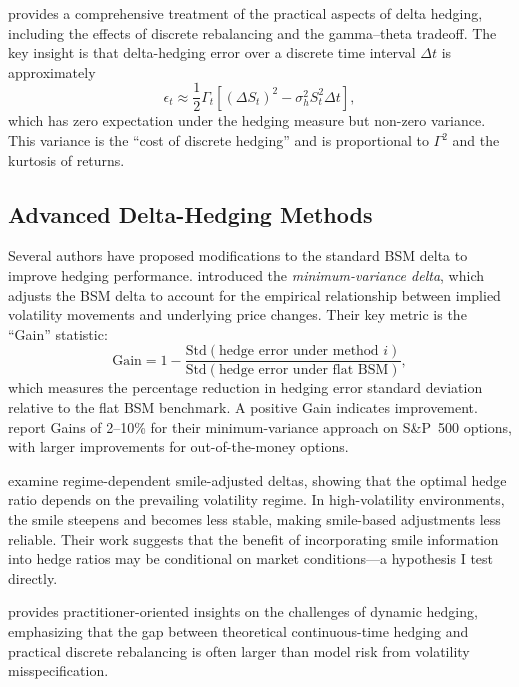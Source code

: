 \documentclass[12pt, letterpaper]{article}
\begin{document}
\citet{Hull2018} provides a comprehensive treatment of the practical aspects of delta hedging, including the effects of discrete rebalancing and the gamma--theta tradeoff. The key insight is that delta-hedging error over a discrete time interval $\Delta t$ is approximately
\begin{equation}
    \epsilon_t \approx \frac{1}{2}\Gamma_t \left[(\Delta S_t)^2 - \sigma_h^2 S_t^2 \Delta t\right],
    \label{eq:discrete_error}
\end{equation}
which has zero expectation under the hedging measure but non-zero variance. This variance is the ``cost of discrete hedging'' and is proportional to $\Gamma^2$ and the kurtosis of returns.

\subsection{Advanced Delta-Hedging Methods}

Several authors have proposed modifications to the standard BSM delta to improve hedging performance. \citet{Hull2017} introduced the \textit{minimum-variance delta}, which adjusts the BSM delta to account for the empirical relationship between implied volatility movements and underlying price changes. Their key metric is the ``Gain'' statistic:
\begin{equation}
    \text{Gain} = 1 - \frac{\text{Std}(\text{hedge error under method } i)}{\text{Std}(\text{hedge error under flat BSM})},
    \label{eq:gain}
\end{equation}
which measures the percentage reduction in hedging error standard deviation relative to the flat BSM benchmark. A positive Gain indicates improvement. \citet{Hull2017} report Gains of 2--10\% for their minimum-variance approach on S\&P~500 options, with larger improvements for out-of-the-money options.

\citet{Alexander2012} examine regime-dependent smile-adjusted deltas, showing that the optimal hedge ratio depends on the prevailing volatility regime. In high-volatility environments, the smile steepens and becomes less stable, making smile-based adjustments less reliable. Their work suggests that the benefit of incorporating smile information into hedge ratios may be conditional on market conditions---a hypothesis I test directly.

\citet{Taleb1997} provides practitioner-oriented insights on the challenges of dynamic hedging, emphasizing that the gap between theoretical continuous-time hedging and practical discrete rebalancing is often larger than model risk from volatility misspecification.
\end{document}
